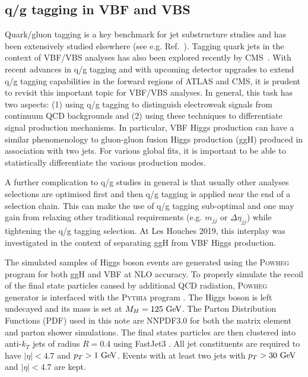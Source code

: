 \documentclass[11pt]{cernrep}
\begin{document}


\clearpage

\subsection{q/g tagging in VBF and VBS}
\label{sec:jets:vbsbvf}
Quark/gluon tagging is a key benchmark for jet substructure studies and has been extensively studied elsewhere (see e.g. Ref.~\cite{Badger:2016bpw,Gras:2017jty}).  Tagging quark jets in the context of VBF/VBS analyses has also been explored recently by CMS~\cite{Khachatryan:2015bnx}.  With recent advances in q/g tagging and with upcoming detector upgrades to extend q/g tagging capabilities in the forward regions of ATLAS and CMS, it is prudent to revisit this important topic for VBF/VBS analyses.  In general, this task has two aspects: (1) using q/g tagging to distinguish electroweak signals from continuum QCD backgrounds and (2) using these techniques to differentiate signal production mechanisms.  In particular, VBF Higgs production can have a similar phenomenology to gluon-gluon fusion Higgs production (ggH) produced in association with two jets.  For various global fits, it is important to be able to statistically differentiate the various production modes. 

A further complication to q/g studies in general is that usually other analyses selections are optimised first and then q/g tagging is applied near the end of a selection chain.  This can make the use of q/g tagging sub-optimal and one may gain from relaxing other traditional requirements (e.g. $m_{jj}$ or $\Delta\eta_{jj}$) while tightening the q/g tagging selection. At Les Houches 2019, this interplay was investigated in the context of separating ggH from VBF Higgs production.

The simulated samples of Higgs boson events are generated using the \textsc{Powheg} program for both ggH \cite{Campbell:2012am} and VBF \cite{Nason:2009ai} at NLO accuracy. To properly simulate the recoil of the final state particles caused by additional QCD radiation, \textsc{Powheg} generator is interfaced with the \textsc{Pythia} program \cite{Sjostrand:2014zea}. The Higgs boson is left undecayed and its mass is set at $M_H=125~\rm GeV$. The Parton Distribution Functions (PDF) used in this note are NNPDF3.0 \cite{Ball:2017nwa} for both the matrix element and parton shower simulations. The final states particles are then clustered into anti-$k_T$\cite{Cacciari:2008gp} jets of radius $R = 0.4$ using FastJet3 \cite{Cacciari:2011ma}. All jet constituents are required to have $|\eta| < 4.7$ and $p_T > 1\rm ~GeV$. Events with at least two jets with $p_T> 30\rm ~GeV$ and $|\eta|<4.7$ are kept.
\end{document}
